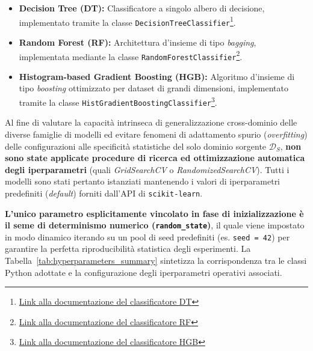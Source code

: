 \begin{itemize}
    \item \textbf{Decision Tree (DT):} Classificatore a singolo albero di decisione, implementato tramite la classe \texttt{DecisionTreeClassifier}\footnote{\href{https://scikit-learn.org/stable/modules/generated/sklearn.tree.DecisionTreeClassifier}{Link alla documentazione del classificatore DT}}.
    \item \textbf{Random Forest (RF):} Architettura d'insieme di tipo \textit{bagging}, implementata mediante la classe \texttt{RandomForestClassifier}\footnote{\href{https://scikit-learn.org/stable/modules/generated/sklearn.ensemble.RandomForestClassifier}{Link alla documentazione del classificatore RF}}.
    \item \textbf{Histogram-based Gradient Boosting (HGB):} Algoritmo d'insieme di tipo \textit{boosting} ottimizzato per dataset di grandi dimensioni, implementato tramite la classe \newline \texttt{HistGradientBoostingClassifier}\footnote{\href{https://scikit-learn.org/stable/modules/generated/sklearn.ensemble.HistGradientBoostingClassifier}{Link alla documentazione del classificatore HGB}}.
\end{itemize}

Al fine di valutare la capacità intrinseca di generalizzazione cross-dominio delle diverse famiglie di modelli ed evitare fenomeni di adattamento spurio (\textit{overfitting}) delle configurazioni alle specificità statistiche del solo dominio sorgente $\mathcal{D}_S$, \textbf{non sono state applicate procedure di ricerca ed ottimizzazione automatica degli iperparametri} (quali \textit{GridSearchCV} o \textit{RandomizedSearchCV}). 
Tutti i modelli sono stati pertanto istanziati mantenendo i valori di iperparametri predefiniti (\textit{default}) forniti dall'API di \texttt{scikit-learn}. 

\textbf{L'unico parametro esplicitamente vincolato in fase di inizializzazione è il seme di determinismo numerico (\texttt{random\_state})}, il quale viene impostato in modo dinamico iterando su un pool di seed predefiniti (es. \texttt{seed = 42}) per garantire la perfetta riproducibilità statistica degli esperimenti. 
La Tabella~\ref{tab:hyperparameters_summary} sintetizza la corrispondenza tra le classi Python adottate e la configurazione degli iperparametri operativi associati.

